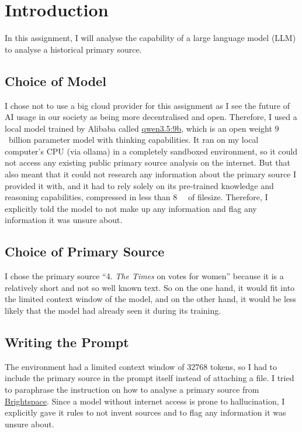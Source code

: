 \section{Introduction}

In this assignment, I will analyse the capability of a large language model (LLM) to analyse a historical primary source.

\subsection{Choice of Model}

I chose not to use a big cloud provider for this assignment as I see the future of AI usage in our society as being more decentralised and open.
Therefore, I used a local model trained by Alibaba called \href{https://ollama.com/library/qwen3.5:9b}{qwen3.5:9b},
which is an open weight $9$~billion parameter model with thinking capabilities.
It ran on my local computer's CPU (via ollama) in a completely sandboxed environment,
so it could not access any existing public primary source analysis on the internet.
But that also meant that it could not research any information about the primary source I provided it with,
and it had to rely solely on its pre-trained knowledge and reasoning capabilities, compressed in less than \qty{8}{\giga\byte} of filesize.
Therefore, I explicitly told the model to not make up any information and flag any information it was unsure about.

\subsection{Choice of Primary Source}

I chose the primary source \enquote{4. \emph{The Times} on votes for women} because it is a relatively short and not so well known text.
So on the one hand, it would fit into the limited context window of the model,
and on the other hand, it would be less likely that the model had already seen it during its training.

\subsection{Writing the Prompt}
The environment had a limited context window of $32768$ tokens, so I had to include the primary source in the prompt itself instead of attaching a file.
I tried to paraphrase the instruction on how to analyse a primary source from \href{https://brightspace.ucd.ie/d2l/le/lessons/400357/units/4372992}{Brightspace}.
Since a model without internet access is prone to hallucination, I explicitly gave it rules to not invent sources and to flag any information it was unsure about.
